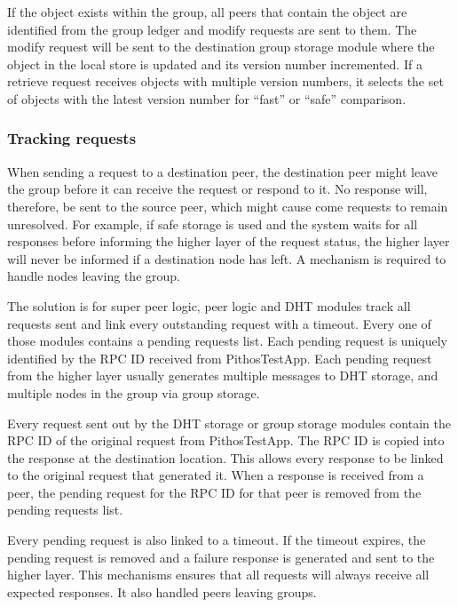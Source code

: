     If the object exists within the group, all peers that contain the object are identified from the group ledger and modify requests are sent to them. The modify request will be sent to the destination group storage module where the object in the local store is updated and its version number incremented. If a retrieve request receives objects with multiple version numbers, it selects the set of objects with the latest version number for ``fast'' or ``safe'' comparison.

    \subsubsection{Tracking requests}
    \label{pending_rpcs_implementation}

    When sending a request to a destination peer, the destination peer might leave the group before it can receive the request or respond to it. No response will, therefore, be sent to the source peer, which might cause come requests to remain unresolved. For example, if safe storage is used and the system waits for all responses before informing the higher layer of the request status, the higher layer will never be informed if a destination node has left. A mechanism is required to handle nodes leaving the group.

    The solution is for super peer logic, peer logic and DHT modules track all requests sent and link every outstanding request with a timeout. Every one of those modules contains a pending requests list. Each pending request is uniquely identified by the RPC ID received from PithosTestApp. Each pending request from the higher layer usually generates multiple messages to DHT storage, and multiple nodes in the group via group storage.

    Every request sent out by the DHT storage or group storage modules contain the RPC ID of the original request from PithosTestApp. The RPC ID is copied into the response at the destination location. This allows every response to be linked to the original request that generated it. When a response is received from a peer, the pending request for the RPC ID for that peer is removed from the pending requests list.

    Every pending request is also linked to a timeout. If the timeout expires, the pending request is removed and a failure response is generated and sent to the higher layer. This mechanisms ensures that all requests will always receive all expected responses. It also handled peers leaving groups.

